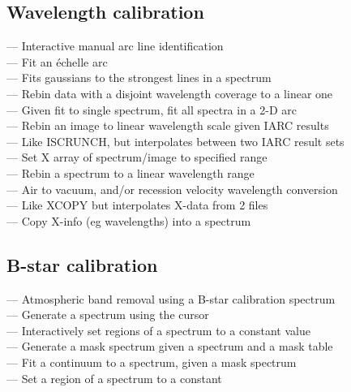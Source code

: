 
\subsection{\label{classifwavelen}Wavelength calibration}

 --- Interactive manual arc line identification\\
 --- Fit an \'echelle arc\\
 --- Fits gaussians to the strongest lines in a spectrum\\
 --- Rebin data with a disjoint wavelength coverage to a linear one\\
 --- Given fit to single spectrum, fit all spectra in a 2-D arc\\
 --- Rebin an image to linear wavelength scale given IARC results\\
 --- Like ISCRUNCH, but interpolates between two IARC result sets\\
 --- Set X array of spectrum/image to specified range\\
 --- Rebin a spectrum to a linear wavelength range\\
 --- Air to vacuum, and/or recession velocity wavelength conversion\\
 --- Like XCOPY but interpolates X-data from 2 files\\
 --- Copy X-info (eg wavelengths) into a spectrum


\subsection{\label{classifbstars}B-star calibration}

 --- Atmospheric band removal using a B-star calibration spectrum\\
 --- Generate a spectrum using the cursor\\
 --- Interactively set regions of a spectrum to a constant value\\
 --- Generate a mask spectrum given a spectrum and a mask table\\
 --- Fit a continuum to a spectrum, given a mask spectrum\\
 --- Set a region of a spectrum to a constant

